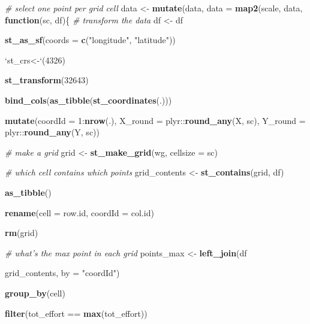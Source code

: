 \documentclass[]{article}
\newenvironment{Shaded}{}{}
\newcommand{\CommentTok}[1]{\textcolor[rgb]{0.38,0.63,0.69}{\textit{#1}}}
\newcommand{\ControlFlowTok}[1]{\textcolor[rgb]{0.00,0.44,0.13}{\textbf{#1}}}
\newcommand{\DataTypeTok}[1]{\textcolor[rgb]{0.56,0.13,0.00}{#1}}
\newcommand{\DecValTok}[1]{\textcolor[rgb]{0.25,0.63,0.44}{#1}}
\newcommand{\KeywordTok}[1]{\textcolor[rgb]{0.00,0.44,0.13}{\textbf{#1}}}
\newcommand{\NormalTok}[1]{#1}
\newcommand{\OperatorTok}[1]{\textcolor[rgb]{0.40,0.40,0.40}{#1}}
\newcommand{\StringTok}[1]{\textcolor[rgb]{0.25,0.44,0.63}{#1}}
\begin{document}
\begin{Shaded}
\begin{Highlighting}[]
{{{{{\CommentTok{# select one point per grid cell}
\NormalTok{data <-}\StringTok{ }\KeywordTok{mutate}\NormalTok{(data, }\DataTypeTok{data =} \KeywordTok{map2}\NormalTok{(scale, data, }\ControlFlowTok{function}\NormalTok{(sc, df)\{}
  \CommentTok{# transform the data}
\NormalTok{  df <-}\StringTok{ }\NormalTok{df }\OperatorTok{%
\StringTok{    }\KeywordTok{st_as_sf}\NormalTok{(}\DataTypeTok{coords =} \KeywordTok{c}\NormalTok{(}\StringTok{"longitude"}\NormalTok{, }\StringTok{"latitude"}\NormalTok{)) }\OperatorTok{%
\StringTok{    `}\DataTypeTok{st_crs<-}\StringTok{`}\NormalTok{(}\DecValTok{4326}\NormalTok{) }\OperatorTok{%
\StringTok{    }\KeywordTok{st_transform}\NormalTok{(}\DecValTok{32643}\NormalTok{) }\OperatorTok{%
\StringTok{    }\KeywordTok{bind_cols}\NormalTok{(}\KeywordTok{as_tibble}\NormalTok{(}\KeywordTok{st_coordinates}\NormalTok{(.))) }\OperatorTok{%
\StringTok{    }\KeywordTok{mutate}\NormalTok{(}\DataTypeTok{coordId =} \DecValTok{1}\OperatorTok{:}\KeywordTok{nrow}\NormalTok{(.),}
           \DataTypeTok{X_round =}\NormalTok{ plyr}\OperatorTok{::}\KeywordTok{round_any}\NormalTok{(X, sc),}
           \DataTypeTok{Y_round =}\NormalTok{ plyr}\OperatorTok{::}\KeywordTok{round_any}\NormalTok{(Y, sc))}
  
  \CommentTok{# make a grid}
\NormalTok{  grid <-}\StringTok{ }\KeywordTok{st_make_grid}\NormalTok{(wg, }\DataTypeTok{cellsize =}\NormalTok{ sc)}
  
  \CommentTok{# which cell contains which points}
\NormalTok{  grid_contents <-}\StringTok{ }\KeywordTok{st_contains}\NormalTok{(grid, df) }\OperatorTok{%
\StringTok{    }\KeywordTok{as_tibble}\NormalTok{() }\OperatorTok{%
\StringTok{    }\KeywordTok{rename}\NormalTok{(}\DataTypeTok{cell =}\NormalTok{ row.id, }\DataTypeTok{coordId =}\NormalTok{ col.id)}
  
  \KeywordTok{rm}\NormalTok{(grid)}
  
  \CommentTok{# what's the max point in each grid}
\NormalTok{  points_max <-}\StringTok{ }\KeywordTok{left_join}\NormalTok{(df }\OperatorTok{%
\NormalTok{                   grid_contents, }\DataTypeTok{by =} \StringTok{"coordId"}\NormalTok{) }\OperatorTok{%
\StringTok{    }\KeywordTok{group_by}\NormalTok{(cell) }\OperatorTok{%
\StringTok{    }\KeywordTok{filter}\NormalTok{(tot_effort }\OperatorTok{==}\StringTok{ }\KeywordTok{max}\NormalTok{(tot_effort))}
  
}}}}}}}}}}}}}}}
\end{Highlighting}
\end{Shaded}
\end{document}
